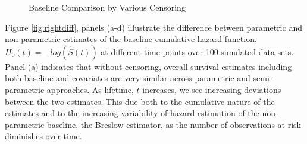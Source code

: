 \documentclass[12pt,letterpaper]{article}
\begin{document}
\begin{figure}[h!]
	\caption{Baseline Comparison by Various Censoring}
	\label{fig:rightbase}
\end{figure}



Figure \ref{fig:rightdiff}, panels (a-d) illustrate the difference between parametric and non-parametric estimates of the baseline cumulative hazard function, $H_0(t) = -log(\hat{S}(t))$ at different time points over 100 simulated data sets.  Panel (a) indicates that without censoring, overall survival estimates including both baseline and covariates are very similar across parametric and semi-parametric approaches.  As lifetime, $t$ increases, we see increasing deviations between the two estimates.  This due both to the cumulative nature of the estimates and to the increasing variability of hazard estimation of the non-parametric baseline, the Breslow estimator,   \citep{DavHink1997,Burr1994} as the number of observations at risk diminishes over time.
\end{document}
